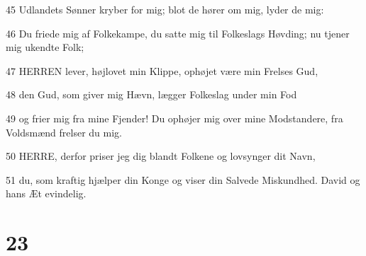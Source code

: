 \par 45 Udlandets Sønner kryber for mig; blot de hører om mig, lyder de mig:
\par 46 Du friede mig af Folkekampe, du satte mig til Folkeslags Høvding; nu tjener mig ukendte Folk;
\par 47 HERREN lever, højlovet min Klippe, ophøjet være min Frelses Gud,
\par 48 den Gud, som giver mig Hævn, lægger Folkeslag under min Fod
\par 49 og frier mig fra mine Fjender! Du ophøjer mig over mine Modstandere, fra Voldsmænd frelser du mig.
\par 50 HERRE, derfor priser jeg dig blandt Folkene og lovsynger dit Navn,
\par 51 du, som kraftig hjælper din Konge og viser din Salvede Miskundhed. David og hans Æt evindelig.

\chapter{23}

